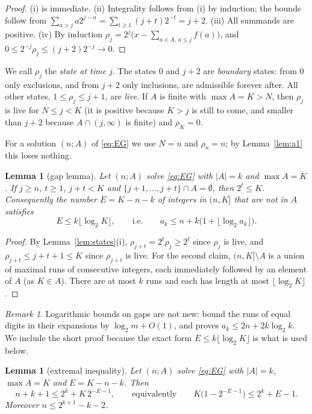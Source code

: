 \documentclass[11pt]{amsart}
\newtheorem{lemma}[theorem]{Lemma}
\theoremstyle{definition}
\theoremstyle{remark}
\newtheorem{remark}[theorem]{Remark}
\begin{document}
\begin{proof}
(i) is immediate. (ii) Integrality follows from (i) by induction; the bounds follow from $\sum_{a>j}a2^{j-a}=\sum_{t\ge1}(j+t)2^{-t}=j+2$. (iii) All summands are positive. (iv) By induction $\rho_j=2^j\bigl(x-\sum_{a\in A,\,a\le j}f(a)\bigr)$, and $0\le 2^{-j}\rho_j\le (j+2)2^{-j}\to0$.
\end{proof}

We call $\rho_j$ the \emph{state at time $j$}. The states $0$ and $j+2$ are \emph{boundary} states: from $0$ only exclusions, and from $j+2$ only inclusions, are admissible forever after. All other states, $1\le\rho_j\le j+1$, are \emph{live}. If $A$ is finite with $\max A=K>N$, then $\rho_j$ is live for $N\le j<K$ (it is positive because $K>j$ is still to come, and smaller than $j+2$ because $A\cap(j,\infty)$ is finite) and $\rho_K=0$.

For a solution $(n;A)$ of \eqref{eq:EG} we use $N=n$ and $\rho_n=n$; by Lemma~\ref{lem:a1} this loses nothing.

\begin{lemma}[gap lemma]\label{lem:gap}
Let $(n;A)$ solve \eqref{eq:EG} with $|A|=k$ and $\max A=K$. If $j\ge n$, $t\ge1$, $j+t<K$ and $\{j+1,\dots,j+t\}\cap A=\emptyset$, then $2^t\le K$. Consequently the number $E=K-n-k$ of integers in $(n,K]$ that are not in $A$ satisfies
\[
E\le k\lfloor\log_2K\rfloor,\qquad\text{i.e.}\qquad a_k\le n+k\bigl(1+\lfloor\log_2 a_k\rfloor\bigr).
\]
\end{lemma}

\begin{proof}
By Lemma~\ref{lem:states}(i), $\rho_{j+t}=2^t\rho_j\ge 2^t$ since $\rho_j$ is live, and $\rho_{j+t}\le j+t+1\le K$ since $\rho_{j+t}$ is live. For the second claim, $(n,K]\setminus A$ is a union of maximal runs of consecutive integers, each immediately followed by an element of $A$ (as $K\in A$). There are at most $k$ runs and each has length at most $\lfloor\log_2K\rfloor$.
\end{proof}

\begin{remark}
Logarithmic bounds on gaps are not new: \cite[Prop.~2, Cor.~2]{BL90} bound the runs of equal digits in their expansions by $\log_2m+O(1)$, and \cite[Thm.~2.8]{TUZ} proves $a_k\le 2n+2k\log_2k$. We include the short proof because the exact form $E\le k\lfloor\log_2 K\rfloor$ is what is used below.
\end{remark}

\begin{lemma}[extremal inequality]\label{lem:extremal}
Let $(n;A)$ solve \eqref{eq:EG} with $|A|=k$, $\max A=K$ and $E=K-n-k$. Then
\[
n+k+1\le 2^k+K\,2^{-E-1},\qquad\text{equivalently}\qquad K\bigl(1-2^{-E-1}\bigr)\le 2^k+E-1 .
\]
Moreover $n\le 2^{k+1}-k-2$.
\end{lemma}
\end{document}
